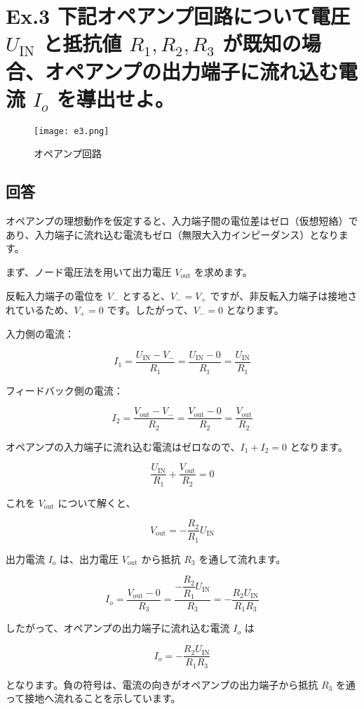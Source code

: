 \documentclass{article}
\begin{document}
\newpage  %

\section*{Ex.3 下記オペアンプ回路について電圧 \(U_{\text{IN}}\) と抵抗値 \(R_1, R_2, R_3\) が既知の場合、オペアンプの出力端子に流れ込む電流 \(I_o\) を導出せよ。}
\begin{figure}[H]
    \centering
    \texttt{[image: e3.png]}
    \caption{オペアンプ回路}
\end{figure}

\subsection*{回答}
オペアンプの理想動作を仮定すると、入力端子間の電位差はゼロ（仮想短絡）であり、入力端子に流れ込む電流もゼロ（無限大入力インピーダンス）となります。

まず、ノード電圧法を用いて出力電圧 \(V_{\text{out}}\) を求めます。

反転入力端子の電位を \(V_-\) とすると、\(V_- = V_+\) ですが、非反転入力端子は接地されているため、\(V_+ = 0\) です。したがって、\(V_- = 0\) となります。

入力側の電流：

\[
I_1 = \frac{U_{\text{IN}} - V_-}{R_1} = \frac{U_{\text{IN}} - 0}{R_1} = \frac{U_{\text{IN}}}{R_1}
\]

フィードバック側の電流：

\[
I_2 = \frac{V_{\text{out}} - V_-}{R_2} = \frac{V_{\text{out}} - 0}{R_2} = \frac{V_{\text{out}}}{R_2}
\]

オペアンプの入力端子に流れ込む電流はゼロなので、\(I_1 + I_2 = 0\) となります。

\[
\frac{U_{\text{IN}}}{R_1} + \frac{V_{\text{out}}}{R_2} = 0
\]

これを \(V_{\text{out}}\) について解くと、

\[
V_{\text{out}} = -\frac{R_2}{R_1} U_{\text{IN}}
\]

出力電流 \(I_o\) は、出力電圧 \(V_{\text{out}}\) から抵抗 \(R_3\) を通して流れます。

\[
I_o = \frac{V_{\text{out}} - 0}{R_3} = \frac{-\dfrac{R_2}{R_1} U_{\text{IN}}}{R_3} = -\frac{R_2 U_{\text{IN}}}{R_1 R_3}
\]

したがって、オペアンプの出力端子に流れ込む電流 \(I_o\) は

\[
I_o = -\frac{R_2 U_{\text{IN}}}{R_1 R_3}
\]

となります。負の符号は、電流の向きがオペアンプの出力端子から抵抗 \(R_3\) を通って接地へ流れることを示しています。
\end{document}

